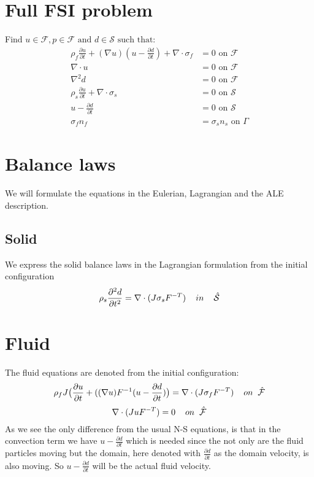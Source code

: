 \section*{Full FSI problem}
Find $u \in \mathcal{F} , p \in \mathcal{F} \text{  and  } d \in \mathcal{S} \text{  such that}:$ 
\begin{align}
\rho_f  \frac{\partial u}{\partial t} + (\nabla u)(u-\frac{\partial d}{\partial t})  + \nabla \cdot \sigma_f  &= 0 \text{  on  } \mathcal{F } \\
\nabla \cdot u  &= 0 \text{  on  } \mathcal{F}   \\
\nabla^2 d &= 0  \text{  on  } \mathcal{F}\\
\rho_s \frac{\partial u}{\partial t} + \nabla \cdot \sigma_s &=0  \text{  on  } \mathcal{ S }\\
u- \frac{\partial d}{\partial t}  &= 0  \text{  on  } \mathcal{ S }\\
\sigma_f  n_f &= \sigma_s  n_s \text{  on  } \Gamma
\end{align}





\section*{Balance laws}
We will formulate the equations in the Eulerian, Lagrangian and the ALE description.

\subsection*{Solid}
We express the solid balance laws in the Lagrangian formulation from the initial configuration
$$\rho_s \frac{\partial^2 d}{\partial t^2} = \nabla \cdot (J \sigma_s F^{-T}) \hspace{4mm}in\hspace{4mm} \hat{\mathcal{S}} $$

\section*{Fluid}
The fluid equations are denoted from the initial configuration:
$$ \rho_f J \big( \frac{\partial u}{\partial t} + ((\nabla u)F^{-1}(u-\frac{\partial d}{\partial t})\big) = \nabla \cdot (J\sigma_f F^{-T} )\hspace{4mm} on \hspace{2mm} \hat{\mathcal{F}}$$
$$ \nabla \cdot (J u F^{-T}) = 0 \hspace{4mm} on \hspace{2mm} \hat{\mathcal{F}}$$
As we see the only difference from the usual N-S equations, is that in the convection term we have $u-\frac{\partial d}{\partial t} $ which is needed since the not only are the fluid particles moving but the domain, here denoted with $\frac{\partial d}{\partial t}$ as the domain velocity, is also moving. So $u-\frac{\partial d}{\partial t}$ will be the actual fluid velocity. 

